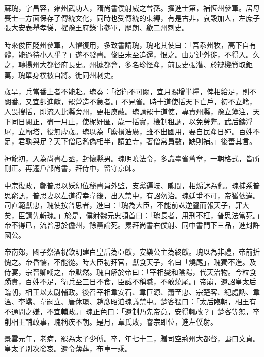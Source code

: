 
\begin{pinyinscope}

 蘇瑰，字昌容，雍州武功人，隋尚書僕射威之曾孫。擢進士第，補恆州參軍。居母喪士一方面保存了傳統文化，同時也受傳統的束縛，有是古非，哀毀加人，左庶子張大安表舉孝悌，擢豫王府錄事參軍，歷朗、歙二州刺史。



 時來俊臣貶州參軍，人懼復用，多致書請瑰，瑰叱其使曰：「吾忝州牧，高下自有體，能過待小人乎？」遂不發書。俊臣未至追還，恨之。由是連外徙，不得入。久之，轉揚州大都督府長史。州據都會，多名珍怪產，前長史張潛、於辯機貲取鉅萬，瑰單身襆被自將。徙同州刺史。



 歲旱，兵當番上者不能赴。瑰奏：「宿衛不可闕，宜月賜增半糧，俾相給足，則不闕番。又宜卻進獻，罷營造不急者。」不見省。時十道使括天下亡戶，初不立籍，人畏搜括，即流入比縣旁州，更相庾蔽。瑰請罷十道使，專責州縣，豫立簿注，天下同日閱正，盡一月止，使柅奸匿，歲一括實，檢制租調，以免勞弊。武后鑄浮屠，立廟塔，役無虛歲。瑰以為「縻損浩廣，雖不出國用，要自民產日殫。百姓不足，君孰與足？天下僧尼濫偽相半，請並寺，著僧常員數，缺則補。」後善其言。



 神龍初，入為尚書右丞，封懷縣男。瑰明曉法令，多識臺省舊章，一朝格式，皆所刪正。再遷戶部尚書，拜侍中，留守京師。



 中宗復政，鄭普思以妖幻位秘書員外監，支黨遍岐、隴間，相煽訹為亂。瑰捕系普思窮訊，普思妻以左道得幸韋後，出入禁中，有詔勿治。瑰廷爭不可，帝猶依違。司直範獻忠，瑰使按普思者，進曰：「瑰為大臣，不能前誅逆豎而報天子，罪大矣，臣請先斬瑰。」於是，僕射魏元忠頓首曰：「瑰長者，用刑不枉，普思法當死。」帝不得已，流普思於儋州，餘黨論死。累拜尚書右僕射、同中書門下三品，進封許國公。



 帝南郊，國子祭酒祝欽明建白皇后為亞獻，安樂公主為終獻。瑰以為非禮，帝前折愧之。帝昏懦，不能從。時大臣初拜官，獻食天子，名曰「燒尾」，瑰獨不進。及侍宴，宗晉卿嘲之，帝默然。瑰自解於帝曰：「宰相燮和陰陽，代天治物。今粒食踴貴，百姓不足，衛兵至三日不食，臣誠不稱職，不敢燒尾。」帝崩，遺詔皇太后臨朝，相王以太尉輔政。後召宰相韋安石、韋巨源、蕭至忠、宗楚客、紀處訥、韋溫、李嶠、韋嗣立、唐休璟、趙彥昭洎瑰議禁中。楚客猥曰：「太后臨朝，相王有不通問之嫌，不宜輔政。」瑰正色曰：「遺制乃先帝意，安得輒改？」楚客等恕，卒削相王輔政事，瑰稱疾不朝。是月，韋氏敗，睿宗即位，進左僕射。



 景雲元年，老病，罷為太子少傅。卒，年七十二，贈司空荊州大都督，謚曰文貞。皇太子別次發哀。遺令薄葬，布車一乘。




\end{pinyinscope}
